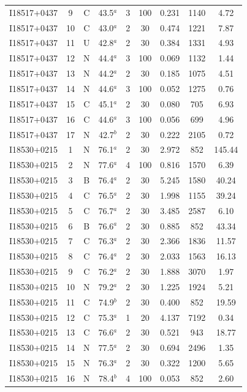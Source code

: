 \begin{table}
\begin{tabular}{ccccccccc}
I18517+0437 & 9 & C & 43.5$^{a}$ & 3 & 100 & 0.231 & 1140 & 4.72 \\
I18517+0437 & 10 & C & 43.0$^{a}$ & 2 & 30 & 0.474 & 1221 & 7.87 \\
I18517+0437 & 11 & U & 42.8$^{a}$ & 2 & 30 & 0.384 & 1331 & 4.93 \\
I18517+0437 & 12 & N & 44.4$^{a}$ & 3 & 100 & 0.069 & 1132 & 1.44 \\
I18517+0437 & 13 & N & 44.2$^{a}$ & 2 & 30 & 0.185 & 1075 & 4.51 \\
I18517+0437 & 14 & N & 44.6$^{a}$ & 3 & 100 & 0.052 & 1275 & 0.76 \\
I18517+0437 & 15 & C & 45.1$^{a}$ & 2 & 30 & 0.080 & 705 & 6.93 \\
I18517+0437 & 16 & C & 44.6$^{a}$ & 3 & 100 & 0.056 & 699 & 4.96 \\
I18517+0437 & 17 & N & 42.7$^{b}$ & 2 & 30 & 0.222 & 2105 & 0.72 \\
I18530+0215 & 1 & N & 76.1$^{a}$ & 2 & 30 & 2.972 & 852 & 145.44 \\
I18530+0215 & 2 & N & 77.6$^{a}$ & 4 & 100 & 0.816 & 1570 & 6.39 \\
I18530+0215 & 3 & B & 76.4$^{a}$ & 2 & 30 & 5.245 & 1580 & 40.24 \\
I18530+0215 & 4 & C & 76.5$^{a}$ & 2 & 30 & 1.998 & 1155 & 39.24 \\
I18530+0215 & 5 & C & 76.7$^{a}$ & 2 & 30 & 3.485 & 2587 & 6.10 \\
I18530+0215 & 6 & B & 76.6$^{a}$ & 2 & 30 & 0.885 & 852 & 43.34 \\
I18530+0215 & 7 & C & 76.3$^{a}$ & 2 & 30 & 2.366 & 1836 & 11.57 \\
I18530+0215 & 8 & C & 76.4$^{a}$ & 2 & 30 & 2.033 & 1563 & 16.13 \\
I18530+0215 & 9 & C & 76.2$^{a}$ & 2 & 30 & 1.888 & 3070 & 1.97 \\
I18530+0215 & 10 & N & 79.2$^{a}$ & 2 & 30 & 1.225 & 1924 & 5.21 \\
I18530+0215 & 11 & C & 74.9$^{b}$ & 2 & 30 & 0.400 & 852 & 19.59 \\
I18530+0215 & 12 & C & 75.3$^{a}$ & 1 & 20 & 4.137 & 7192 & 0.34 \\
I18530+0215 & 13 & C & 76.6$^{a}$ & 2 & 30 & 0.521 & 943 & 18.77 \\
I18530+0215 & 14 & N & 77.5$^{a}$ & 2 & 30 & 0.694 & 2496 & 1.35 \\
I18530+0215 & 15 & N & 76.3$^{a}$ & 2 & 30 & 0.322 & 1200 & 5.65 \\
I18530+0215 & 16 & N & 78.4$^{b}$ & 4 & 100 & 0.053 & 852 & 2.60 \\

\end{tabular}
\end{table}
